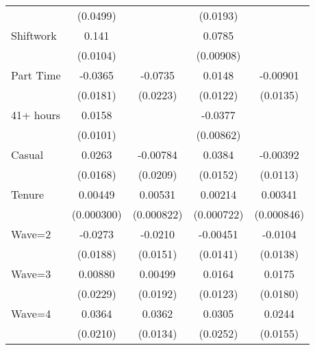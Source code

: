 {\begin{tabular}{l*{4}{c}}
                    &    (0.0499)         &                     &    (0.0193)         &                     \\
[1em]
Shiftwork           &       0.141\sym{***}&                     &      0.0785\sym{***}&                     \\
                    &    (0.0104)         &                     &   (0.00908)         &                     \\
[1em]
Part Time           &     -0.0365\sym{*}  &     -0.0735\sym{***}&      0.0148         &    -0.00901         \\
                    &    (0.0181)         &    (0.0223)         &    (0.0122)         &    (0.0135)         \\
[1em]
41+ hours           &      0.0158         &                     &     -0.0377\sym{***}&                     \\
                    &    (0.0101)         &                     &   (0.00862)         &                     \\
[1em]
Casual              &      0.0263         &    -0.00784         &      0.0384\sym{*}  &    -0.00392         \\
                    &    (0.0168)         &    (0.0209)         &    (0.0152)         &    (0.0113)         \\
[1em]
Tenure              &     0.00449\sym{***}&     0.00531\sym{***}&     0.00214\sym{**} &     0.00341\sym{***}\\
                    &  (0.000300)         &  (0.000822)         &  (0.000722)         &  (0.000846)         \\
[1em]
Wave=2              &     -0.0273         &     -0.0210         &    -0.00451         &     -0.0104         \\
                    &    (0.0188)         &    (0.0151)         &    (0.0141)         &    (0.0138)         \\
[1em]
Wave=3              &     0.00880         &     0.00499         &      0.0164         &      0.0175         \\
                    &    (0.0229)         &    (0.0192)         &    (0.0123)         &    (0.0180)         \\
[1em]
Wave=4              &      0.0364         &      0.0362\sym{**} &      0.0305         &      0.0244         \\
                    &    (0.0210)         &    (0.0134)         &    (0.0252)         &    (0.0155)         \\

\end{tabular}}
